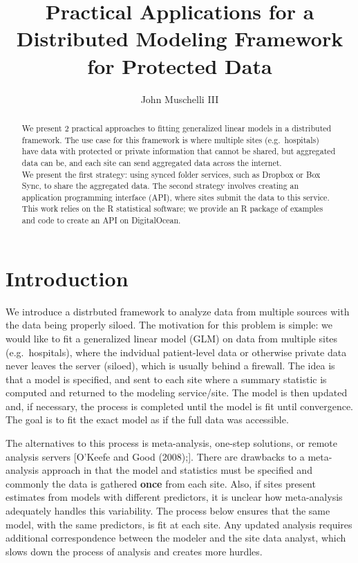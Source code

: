 \documentclass[]{elsarticle} %
\begin{document}
\begin{frontmatter}

  \title{Practical Applications for a Distributed Modeling Framework for
Protected Data}
    \author[Johns Hopkins Bloomberg School of Public Health]{John
Muschelli III}
      \address[Johns Hopkins Bloomberg School of Public
Health]{Department of Biostatistics, 615 N Wolfe St, Baltimore MD,
21205}
    
  \begin{abstract}
  We present 2 practical approaches to fitting generalized linear models
  in a distributed framework. The use case for this framework is where
  multiple sites (e.g.~hospitals) have data with protected or private
  information that cannot be shared, but aggregated data can be, and
  each site can send aggregated data across the internet.\\
  We present the first strategy: using synced folder services, such as
  Dropbox or Box Sync, to share the aggregated data. The second strategy
  involves creating an application programming interface (API), where
  sites submit the data to this service. This work relies on the R
  statistical software; we provide an R package of examples and code to
  create an API on DigitalOcean.
  \end{abstract}
  
 \end{frontmatter}

\hypertarget{introduction}{%
\section{Introduction}\label{introduction}}

We introduce a distrbuted framework to analyze data from multiple
sources with the data being properly siloed. The motivation for this
problem is simple: we would like to fit a generalized linear model (GLM)
on data from multiple sites (e.g.~hospitals), where the indvidual
patient-level data or otherwise private data never leaves the server
(siloed), which is usually behind a firewall. The idea is that a model
is specified, and sent to each site where a summary statistic is
computed and returned to the modeling service/site. The model is then
updated and, if necessary, the process is completed until the model is
fit until convergence. The goal is to fit the exact model as if the full
data was accessible.

The alternatives to this process is meta-analysis, one-step solutions,
or remote analysis servers {[}O'Keefe and Good (2008);{]}. There are
drawbacks to a meta-analysis approach in that the model and statistics
must be specified and commonly the data is gathered \textbf{once} from
each site. Also, if sites present estimates from models with different
predictors, it is unclear how meta-analysis adequately handles this
variability. The process below ensures that the same model, with the
same predictors, is fit at each site. Any updated analysis requires
additional correspondence between the modeler and the site data analyst,
which slows down the process of analysis and creates more hurdles.
\end{document}
